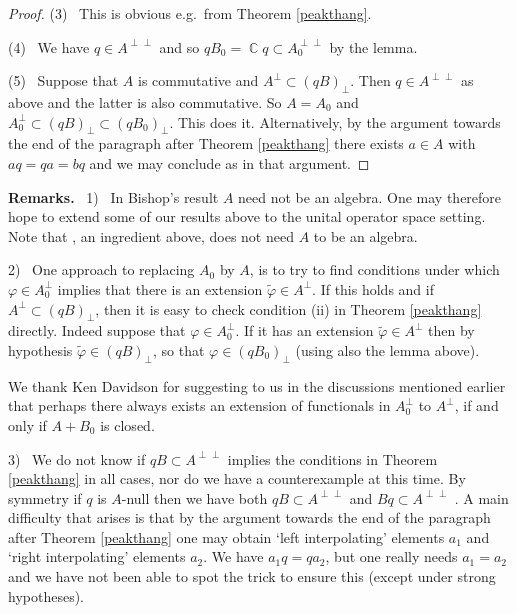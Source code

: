 \documentclass{amsart}
\theoremstyle{remark}
\theoremstyle{definition}
\numberwithin{equation}{section}
\DeclareMathOperator{\Cdb}{{\mathbb C}}
\begin{document}
\begin{proof}
(3) \ This is obvious e.g.\ from Theorem \ref{peakthang}.  

 (4) \ We have $q \in A^{\perp \perp}$
and so $q B_0 = \Cdb q \subset A_0^{\perp \perp}$ by  the lemma. 

(5) \ Suppose that $A$ is commutative and $A^{\perp} \subset (q B)_\perp$.   Then $q \in A^{\perp \perp}$ as above and the latter is also commutative.  So $A = A_0$
and $A_0^{\perp} \subset (q B)_\perp \subset (q B_0)_\perp$.
This does it.  Alternatively, by the argument towards the end of the paragraph after Theorem \ref{peakthang} there exists $a \in A$ with $aq = qa = bq$ 
and we may conclude as in that argument. 
\end{proof}




{\bf Remarks.} \ 1) \ In Bishop's result $A$ need not be an algebra.   One may therefore hope to extend some of our results above to the  unital operator space setting.   Note that 
\cite[Proposition 3.4]{Hay}, an ingredient above, does not need $A$ to be an algebra.   


2)	\ One approach to replacing $A_0$ by $A$, is to try to find conditions under which $\varphi \in A_0^\perp$ 
implies that there is an extension $\tilde{\varphi} \in A^\perp$.     If this holds and if  $A^\perp \subset 
(q B)_\perp$, then it is easy to check condition (ii) in Theorem \ref{peakthang} directly.   Indeed suppose that $\varphi \in A_0^\perp$.   
If it has an extension $\tilde{\varphi} \in A^\perp$ then 
by hypothesis $\tilde{\varphi} \in (q B)_\perp$, so that $\varphi \in (q B_0)_\perp$ (using also the lemma above).  

We thank Ken Davidson for suggesting to us in the discussions mentioned earlier that perhaps there always exists an extension 
of functionals in $A_0^\perp$ to $A^\perp$,
if and only if  $A+B_0$ is closed.

3) \ We  do not know if $qB  \subset A^{\perp \perp}$ implies the conditions in  Theorem \ref{peakthang} in all cases, nor do we have a counterexample at this time.  
By symmetry if $q$ is $A$-null then we have both $qB  \subset A^{\perp \perp}$  and $Bq  \subset A^{\perp \perp}$ .
A main difficulty that arises is that by the argument towards the end of the paragraph after Theorem \ref{peakthang} 
one may obtain `left interpolating' elements $a_1$ and `right interpolating' elements $a_2$.  We have  
$a_1 q = q a_2$, but one really needs $a_1 = a_2$ and we have not been able to spot the trick to ensure this (except under strong hypotheses).
\end{document}

